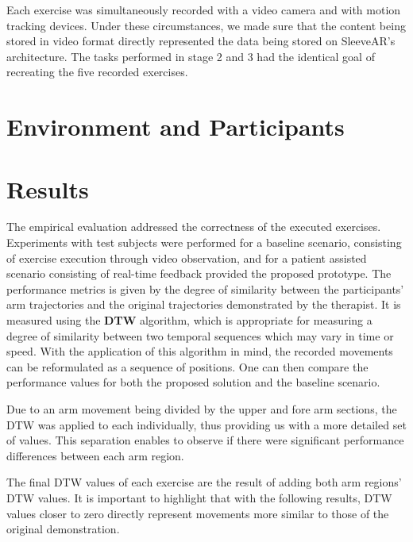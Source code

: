 Each exercise was simultaneously recorded with a video camera and with motion tracking devices. Under these circumstances, we made sure that the content being stored in video format directly represented the data being stored on SleeveAR's architecture.
The tasks performed in stage 2 and 3 had the identical goal of recreating the five recorded exercises.


\section{Environment and Participants} 



\section{Results}
\label{sec:results}

The empirical evaluation addressed the correctness of the executed exercises. Experiments with test subjects were performed for a baseline scenario, consisting of exercise execution through video observation, and for a patient assisted scenario consisting of real-time feedback provided the proposed prototype. The performance metrics is given by the degree of similarity between the participants' arm trajectories and the original trajectories demonstrated by the therapist. It is measured using the \textbf{\ac{DTW}}  algorithm, 
which is appropriate for measuring a degree of similarity between two temporal sequences which may vary in time or speed. With the application of this algorithm in mind, the recorded movements can be reformulated as a sequence of positions. One can then compare the performance values for both the proposed solution and the baseline scenario.

Due to an arm movement being divided by the upper and fore arm sections, the \ac{DTW} was applied to each individually, thus providing us with a more detailed set of values. This separation enables to observe if there were significant performance differences between each arm region.

The final \ac{DTW} values of each exercise are the result of adding both arm regions' DTW values. It is important to highlight that with the following results, DTW values closer to zero directly represent movements more similar to those of the original demonstration.


